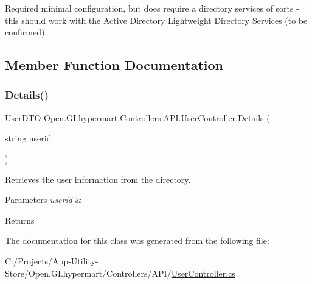 Required minimal configuration, but does require a directory services of sorts -\/ this should work with the Active Directory Lightweight Directory Services (to be confirmed). 

\subsection{Member Function Documentation}
\hypertarget{class_open_1_1_g_i_1_1hypermart_1_1_controllers_1_1_a_p_i_1_1_user_controller_af2896a942d750bcc948228c298221f15}{}\label{class_open_1_1_g_i_1_1hypermart_1_1_controllers_1_1_a_p_i_1_1_user_controller_af2896a942d750bcc948228c298221f15} 
\subsubsection{\texorpdfstring{Details()}{Details()}}
{\footnotesize\ttfamily \hyperlink{class_open_1_1_g_i_1_1hypermart_1_1_data_transformation_objects_1_1_user_d_t_o}{User\+D\+TO} Open.\+G\+I.\+hypermart.\+Controllers.\+A\+P\+I.\+User\+Controller.\+Details (\begin{DoxyParamCaption}\item[{string}]{userid }\end{DoxyParamCaption})}



Retrieves the user information from the directory. 


\begin{DoxyParams}{Parameters}
{\em userid} & \\
\hline
\end{DoxyParams}
\begin{DoxyReturn}{Returns}

\end{DoxyReturn}


The documentation for this class was generated from the following file\+:\begin{DoxyCompactItemize}
\item 
C\+:/\+Projects/\+App-\/\+Utility-\/\+Store/\+Open.\+G\+I.\+hypermart/\+Controllers/\+A\+P\+I/\hyperlink{_a_p_i_2_user_controller_8cs}{User\+Controller.\+cs}\end{DoxyCompactItemize}
